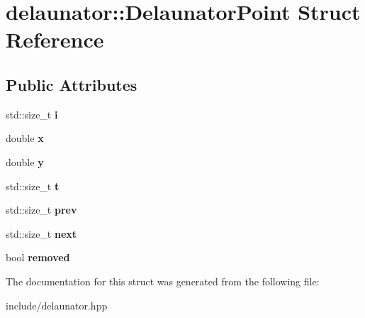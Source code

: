 \hypertarget{structdelaunator_1_1DelaunatorPoint}{}\section{delaunator\+:\+:Delaunator\+Point Struct Reference}
\label{structdelaunator_1_1DelaunatorPoint}
\subsection*{Public Attributes}
\begin{DoxyCompactItemize}
\item 
\mbox{\label{structdelaunator_1_1DelaunatorPoint_aa86be67d87cfc564557b05786ee0213b}} 
std\+::size\+\_\+t {\bfseries i}
\item 
\mbox{\label{structdelaunator_1_1DelaunatorPoint_a6d0cf1b98a5ec895fcac5c1c2a10b926}} 
double {\bfseries x}
\item 
\mbox{\label{structdelaunator_1_1DelaunatorPoint_a9137c3a0356dfc8a330b34f2944864a5}} 
double {\bfseries y}
\item 
\mbox{\label{structdelaunator_1_1DelaunatorPoint_ab35213b07c403aa7ff3d927c7ca0d464}} 
std\+::size\+\_\+t {\bfseries t}
\item 
\mbox{\label{structdelaunator_1_1DelaunatorPoint_ab72027bce56e71be2d68440fbf261722}} 
std\+::size\+\_\+t {\bfseries prev}
\item 
\mbox{\label{structdelaunator_1_1DelaunatorPoint_aa6196f04bd176a2648d63f9235212f6b}} 
std\+::size\+\_\+t {\bfseries next}
\item 
\mbox{\label{structdelaunator_1_1DelaunatorPoint_ad2b84b88913a220615d6179ea6283b0d}} 
bool {\bfseries removed}
\end{DoxyCompactItemize}


The documentation for this struct was generated from the following file\+:\begin{DoxyCompactItemize}
\item 
include/delaunator.\+hpp\end{DoxyCompactItemize}

